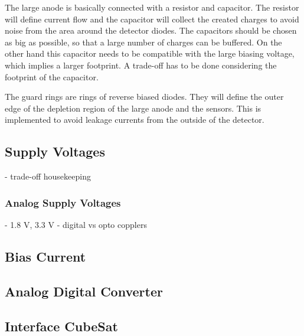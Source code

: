 The large anode is basically connected with a resistor and capacitor.
The resistor will define current flow and the capacitor will collect the created charges to avoid noise from the area around the detector diodes.
The capacitors should be chosen as big as possible, so that a large number of charges can be buffered.
On the other hand this capacitor needs to be compatible with the large biasing voltage, which implies a larger footprint.
A trade-off has to be done considering the footprint of the capacitor.

The guard rings are rings of reverse biased diodes.
They will define the outer edge of the depletion region of the large anode and the sensors.
This is implemented to avoid leakage currents from the outside of the detector.


\subsection{Supply Voltages}
\label{sec:power_supplies}
- trade-off housekeeping

\subsubsection{Analog Supply Voltages}
\label{sec:analog_supply}
- 1.8 V, 3.3 V
- digital vs opto copplers

\subsection{Bias Current}
\label{sec:bias_current}


\subsection{Analog Digital Converter}
\label{sec:adc}


\subsection{Interface CubeSat}
\label{sec:interface_cubesat}
